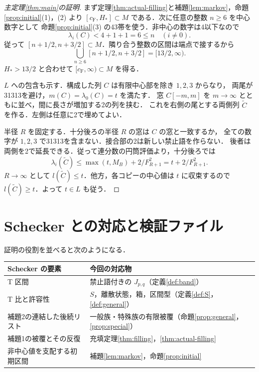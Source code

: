 \documentclass[10pt,a4paper]{article}
\theoremstyle{definition}
\newcommand{\CF}{c_{\mathrm F}}
\begin{document}
\begin{proof}[主定理\ref{thm:main}の証明]
まず定理\ref{thm:actual-filling}と補題\ref{lem:markov}，命題\ref{prop:initial}(1)，(2) より
$[\CF,H_*]\subset M$ である．次に任意の整数 $n\ge6$ を中心数字として
命題\ref{prop:initial}(3) の43帯を使う．非中心の数字は4以下なので
\[
 \lambda_i(C)<4+1+1=6\le n\quad(i\ne0).
\]
従って $[n+1/2,n+3/2]\subset M$．隣り合う整数の区間は端点で接するから
\[
 \bigcup_{n\ge6}[n+1/2,n+3/2]=[13/2,\infty).
\]
$H_*>13/2$ と合わせて $[\CF,\infty)\subset M$ を得る．

$L$ への包含も示す．構成した列 $C$ は有限中心部を除き $1,2,3$ からなり，
両尾が31313を避け，$m(C)=\lambda_0(C)=t$ を満たす．
窓 $C[-m,m]$ を $m\to\infty$ とともに並べ，間に長さが増加する2の列を挟む．
これを右側の尾とする両側列 $\widetilde C$ を作る．左側は任意に2で埋めてよい．

半径 $R$ を固定する．十分後ろの半径 $R$ の窓は $C$ の窓と一致するか，
全ての数字が $1,2,3$ で31313を含まない．接合部の2は新しい禁止語を作らない．
後者は両側を2で延長できる．従って連分数の円筒評価より，十分後ろでは
\[
 \lambda_i(\widetilde C)\le\max(t,M_B)+2/F_{R+1}^2=t+2/F_{R+1}^2.
\]
$R\to\infty$ として $l(\widetilde C)\le t$．他方，各コピーの中心値は $t$ に収束するので
$l(\widetilde C)\ge t$．よって $t\in L$ も従う．
\end{proof}

\section{Schecker との対応と検証ファイル}
証明の役割を並べると次のようになる．
\begin{center}\small
\begin{tabular}{p{.29\linewidth}p{.61\linewidth}}
\toprule
Schecker の要素 & 今回の対応物\\\midrule
T 区間 & 禁止語付きの $J_{p,q}$（定義\ref{def:band}）\\
T 比と許容性 & $S$，離散状態，箱，区間型（定義\ref{def:S}，\ref{def:general}）\\
補題2の連結した後続リスト & 一般族・特殊族の有限被覆（命題\ref{prop:general}，\ref{prop:special}）\\
補題1の被覆とその反復 & 充填定理\ref{thm:filling}，\ref{thm:actual-filling}\\
非中心値を支配する初期区間 & 補題\ref{lem:markov}，命題\ref{prop:initial}\\\bottomrule
\end{tabular}
\end{center}
\end{document}
